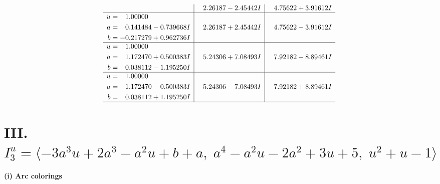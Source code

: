 \documentclass[1p]{elsarticle_modified}
\theoremstyle{definition}
\begin{document}
$$\begin{array}{c|c|c}
 & \phantom{-}2.26187 - 2.45442 I & \phantom{-}4.75622 + 3.91612 I \\ \hline\begin{aligned}
u &= \phantom{-}1.00000\phantom{ +0.000000I} \\
a &= \phantom{-}0.141484 - 0.739668 I \\
b &= -0.217279 + 0.962736 I\end{aligned}
 & \phantom{-}2.26187 + 2.45442 I & \phantom{-}4.75622 - 3.91612 I \\ \hline\begin{aligned}
u &= \phantom{-}1.00000\phantom{ +0.000000I} \\
a &= \phantom{-}1.172470 + 0.500383 I \\
b &= \phantom{-}0.038112 - 1.195250 I\end{aligned}
 & \phantom{-}5.24306 + 7.08493 I & \phantom{-}7.92182 - 8.89461 I \\ \hline\begin{aligned}
u &= \phantom{-}1.00000\phantom{ +0.000000I} \\
a &= \phantom{-}1.172470 - 0.500383 I \\
b &= \phantom{-}0.038112 + 1.195250 I\end{aligned}
 & \phantom{-}5.24306 - 7.08493 I & \phantom{-}7.92182 + 8.89461 I\\
 \hline 
 \end{array}$$\newpage\newpage\renewcommand{\arraystretch}{1}
\centering \section*{III. $I^u_{3}= \langle -3 a^3 u+2 a^3- a^2 u+b+a,\;a^4- a^2 u-2 a^2+3 u+5,\;u^2+u-1 \rangle$}
\flushleft \textbf{(i) Arc colorings}\\
\end{document}
